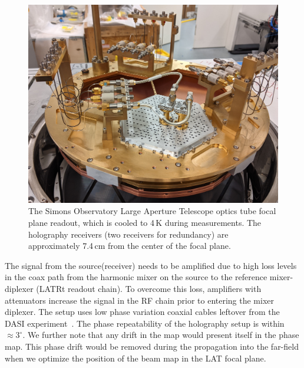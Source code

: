 \begin{figure}[ht]
    \centering
    \includegraphics[width = \textwidth]{Figures/FPA.jpeg}
    \caption{The Simons Observatory Large Aperture Telescope optics tube focal plane readout, which is cooled to 4\,K during measurements.  The holography receivers (two receivers for redundancy) are approximately 7.4\,cm from the center of the focal plane.}
    \label{fig:fpa}
\end{figure}

The signal from the source(receiver) needs to be amplified due to high loss levels in the coax path from the harmonic mixer on the source to the reference mixer-diplexer (LATRt readout chain).  To overcome this loss, amplifiers with attenuators  increase the signal in the RF chain prior to entering the mixer diplexer.  The setup uses low phase variation coaxial cables leftover from the DASI experiment~\cite{CHURCH20031083}.  The phase repeatability of the holography setup is within $\approx3^{\circ}$.  We further note that any drift in the map would present itself in the phase map.  This phase drift would be removed during the propagation into the far-field when we optimize the position of the beam map in the LAT focal plane. 

